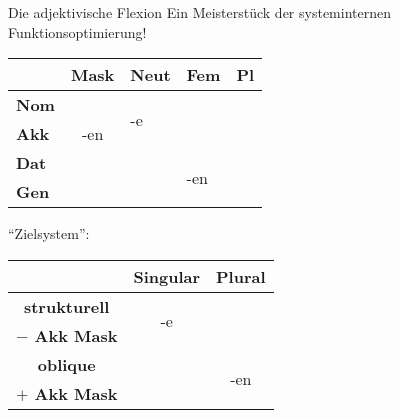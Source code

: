 \begin{frame}
  {Die adjektivische Flexion}
  \pause
  Ein Meisterstück der systeminternen Funktionsoptimierung!\\
  \Zeile
  \pause
  \begin{center}
    \begin{tabular}{|l|llll|}
      \cline{2-5}
      \multicolumn{1}{c|}{}& \textbf{Mask} & \textbf{Neut} & \textbf{Fem} & \textbf{Pl} \\
      \hline
      \textbf{Nom} && \multirow{2}{*}{-e} & \multicolumn{1}{c|}{} & \\ \cline{2-2}
      \textbf{Akk} & \multicolumn{1}{c|}{-en} && \multicolumn{1}{c|}{} & \\ \cline{2-4}
      \textbf{Dat} &&& \multirow{2}{*}{-en} & \\
      \textbf{Gen} &&&& \\
      \hline
    \end{tabular}
  \end{center}
  \pause
  "`Zielsystem"':\\
  \begin{center}
    \begin{tabular}{|l|c|c|}
      \cline{2-3}
      \multicolumn{1}{c|}{} & \multicolumn{1}{c|}{\textbf{Singular}} & \multicolumn{1}{c|}{\textbf{Plural}} \\
      \hline
      \multicolumn{1}{|c|}{\textbf{strukturell}} & \multirow{2}{*}{-e} &  \\
      \multicolumn{1}{|c|}{\textbf{$-$ Akk Mask}} &  &  \\
      \cline{1-2}
      \multicolumn{1}{|c|}{\textbf{oblique}} & \multicolumn{1}{c}{} & \multirow{2}{*}{-en} \\
      \multicolumn{1}{|c|}{\textbf{$+$ Akk Mask}} & \multicolumn{1}{c}{} & \\
      \hline
    \end{tabular}
  \end{center}
\end{frame}


